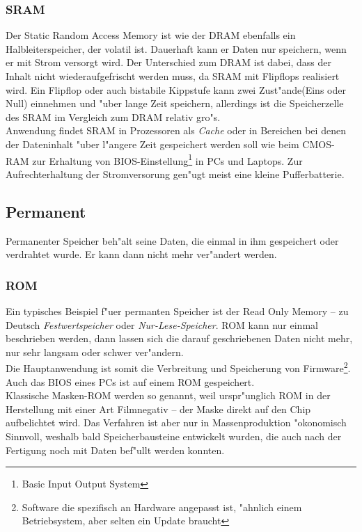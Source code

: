 				\subsubsection{SRAM}
				\label{ch:Technisch:sec:Elektronische Speicherung:sub:Fl"uchtig:subsub:SRAM}
				
					Der \glqq Static Random Access Memory\grqq{} ist wie der DRAM ebenfalls ein Halbleiterspeicher, der volatil ist. Dauerhaft kann er Daten nur speichern, wenn er mit Strom versorgt wird. Der Unterschied zum DRAM ist dabei, dass der Inhalt nicht wiederaufgefrischt werden muss, da SRAM mit Flipflops realisiert wird. Ein Flipflop oder auch bistabile Kippstufe kann zwei Zust"ande(Eins oder Null) einnehmen und "uber lange Zeit speichern, allerdings ist die Speicherzelle des SRAM im Vergleich zum DRAM relativ gro"s.
					\\
					Anwendung findet SRAM in Prozessoren als \textit{Cache} oder in Bereichen bei denen der Dateninhalt "uber l"angere Zeit gespeichert werden soll wie beim CMOS-RAM zur Erhaltung von BIOS-Einstellung\footnote{Basic Input Output System} in PCs und Laptops. Zur Aufrechterhaltung der Stromversorung gen"ugt meist eine kleine Pufferbatterie.
					
        
        \subsection{Permanent}
        \label{ch:Technisch:sec:Elektronische Speicherung:sub:Permanent}
        
            Permanenter Speicher beh"alt seine Daten, die einmal in ihm gespeichert oder verdrahtet wurde. Er kann dann nicht mehr ver"andert werden.
			
				\subsubsection{ROM}
				\label{ch:Technisch:sec:Elektronische Speicherung:sub:Fl"uchtig:subsub:ROM}
				
					Ein typisches Beispiel f"uer permanten Speicher ist der \glqq Read Only Memory\grqq{} – zu Deutsch \textit{Festwertspeicher} oder \textit{Nur-Lese-Speicher}. ROM kann nur einmal beschrieben werden, dann lassen sich die darauf geschriebenen Daten nicht mehr, nur sehr langsam oder schwer ver"andern. 
					\\
					Die Hauptanwendung ist somit die Verbreitung und Speicherung von Firmware\footnote{Software die spezifisch an Hardware angepasst ist, "ahnlich einem Betriebsystem, aber selten ein Update braucht}. Auch das BIOS eines PCs ist auf einem ROM gespeichert.
					\\
					Klassische Masken-ROM werden so genannt, weil urspr"unglich ROM in der Herstellung mit einer Art Filmnegativ – der \glqq Maske\grqq{} direkt auf den Chip aufbelichtet wird. Das Verfahren ist aber nur in Massenproduktion "okonomisch Sinnvoll, weshalb bald Speicherbausteine entwickelt wurden, die auch nach der Fertigung noch mit Daten bef"ullt werden konnten.
				
